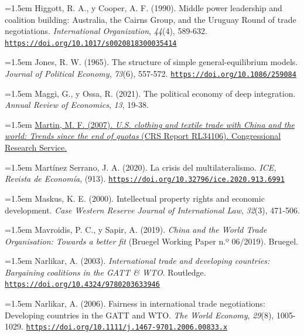 \documentclass[10pt,a4paper]{article}
\begin{document}
\noindent\hangindent=1.5em Higgott, R. A., y Cooper, A. F. (1990). Middle power leadership and coalition building: Australia, the Cairns Group, and the Uruguay Round of trade negotiations. \textit{International Organization}, \textit{44}(4), 589-632. \href{https://doi.org/10.1017/s0020818300035414}{\nolinkurl{https://doi.org/10.1017/s0020818300035414}}

\noindent\hangindent=1.5em Jones, R. W. (1965). The structure of simple general-equilibrium models. \textit{Journal of Political Economy}, \textit{73}(6), 557-572. \href{https://doi.org/10.1086/259084}{\nolinkurl{https://doi.org/10.1086/259084}}

\noindent\hangindent=1.5em Maggi, G., y Ossa, R. (2021). The political economy of deep integration. \textit{Annual Review of Economics}, \textit{13}, 19-38.

\noindent\hangindent=1.5em \href{https://www.everycrsreport.com/reports/RL34106.html}{Martin, M. F. (2007). \textit{U.S. clothing and textile trade with China and the world: Trends since the end of quotas} (CRS Report RL34106). Congressional Research Service.}

\noindent\hangindent=1.5em Martínez Serrano, J. A. (2020). La crisis del multilateralismo. \textit{ICE, Revista de Economía}, (913). \href{https://doi.org/10.32796/ice.2020.913.6991}{\nolinkurl{https://doi.org/10.32796/ice.2020.913.6991}}

\noindent\hangindent=1.5em Maskus, K. E. (2000). Intellectual property rights and economic development. \textit{Case Western Reserve Journal of International Law}, \textit{32}(3), 471-506.

\noindent\hangindent=1.5em Mavroidis, P. C., y Sapir, A. (2019). \textit{China and the World Trade Organisation: Towards a better fit} (Bruegel Working Paper n.º 06/2019). Bruegel.

\noindent\hangindent=1.5em Narlikar, A. (2003). \textit{International trade and developing countries: Bargaining coalitions in the GATT \& WTO}. Routledge. \href{https://doi.org/10.4324/9780203633946}{\nolinkurl{https://doi.org/10.4324/9780203633946}}

\noindent\hangindent=1.5em Narlikar, A. (2006). Fairness in international trade negotiations: Developing countries in the GATT and WTO. \textit{The World Economy}, \textit{29}(8), 1005-1029. \href{https://doi.org/10.1111/j.1467-9701.2006.00833.x}{\nolinkurl{https://doi.org/10.1111/j.1467-9701.2006.00833.x}}
\end{document}
